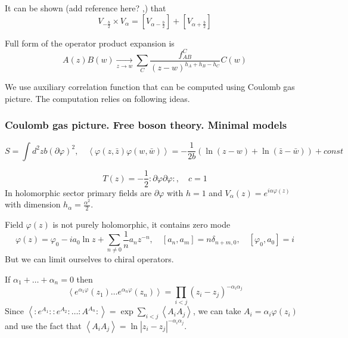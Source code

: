 \documentclass[a4paper,12pt]{article}
\theoremstyle{definition}
\theoremstyle{definition}
\theoremstyle{definition}
\begin{document}
It can be shown (add reference here? \cite{nakayama2004liouville},\cite{teschner2001liouville}) that 
\begin{equation}
  \label{eq:34}
  V_{-\frac{b}{2}}\times V_{\alpha}= [V_{\alpha-\frac{b}{2}}]+[V_{\alpha+\frac{b}{2}}]
\end{equation}


Full form of the operator product expansion is
\begin{equation}
  \label{eq:39}
  A(z)B(w)\underset{z\to w}{\longrightarrow} \sum_{C} \frac{f_{AB}^{C}}{(z-w)^{h_{A}+h_{B}-h_{C}}} C(w)
\end{equation}

We use auxiliary correlation function that can be computed using Coulomb gas picture. The
computation relies on following ideas.


\subsubsection{Coulomb gas picture. Free boson theory. Minimal models}
\label{sec:free-boson-minimal-models}


\begin{equation}
  \label{eq:40}
  S=\int d^{2}z b (\partial \varphi)^{2},\quad \left<\varphi(z,\bar z)\varphi(w,\bar
    w)\right>=-\frac{1}{2b}\left(\ln (z-w) + \ln (\bar z - \bar w)\right)+const
\end{equation}

\begin{equation}
  \label{eq:42}
  T(z)=-\frac{1}{2}:\partial \varphi \partial \varphi:, \quad c=1
\end{equation}
In holomorphic sector primary fields are $\partial \varphi$ with $h=1$ and
$V_{\alpha}(z)=e^{i \alpha \varphi(z)}$ with dimension $h_{\alpha}=\frac{\alpha^{2}}{2}$.

Field $\varphi(z)$ is not purely holomorphic, it contains zero mode
\begin{equation}
  \label{eq:43}
  \varphi(z)=\varphi_{0}-ia_{0}\ln z+\sum_{n\neq 0}\frac{1}{n}a_{n} z^{-n},\quad
  [a_{n},a_{m}]=n\delta_{n+m,0}, \quad [\varphi_{0},a_{0}]=i
\end{equation}
But we can limit ourselves to chiral operators.

If $\alpha_{1}+\dots+\alpha_{n}=0$ then 
\begin{equation}
  \label{eq:41}
  \left<e^{\alpha_{1}\varphi}(z_{1})\dots e^{\alpha_{n}\varphi}(z_{n})\right> = \prod_{i<j}(z_{i}-z_{j})^{-\alpha_{i}\alpha_{j}}
\end{equation}
Since $\left< :e^{A_{1}}::e^{A_{2}}:\dots :A^{A_{n}}:\right> =
\exp\sum_{i<j}\left<A_{i}A_{j}\right>$, we can take $A_{i}=\alpha_{i}\varphi(z_{i})$ and use the
fact that $\left<A_{i}A_{j}\right>=\ln |z_{i}-z_{j}|^{-\alpha_{i}\alpha_{j}}$. 
\end{document}

